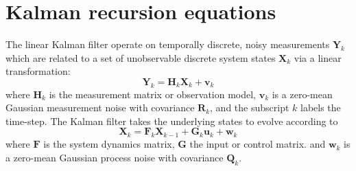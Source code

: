 \documentclass[fleqn,usenatbib,useAMS]{mnras}
\begin{document}
\section{Kalman recursion equations} \label{sec:kalman}
The linear Kalman filter operate on temporally discrete, noisy measurements $\boldsymbol{Y}_k$ which are related to a set of unobservable discrete system states $\boldsymbol{X}_k$ via a linear transformation:
\begin{equation}
	\boldsymbol{Y}_k = \boldsymbol{H}_k \boldsymbol{X}_k + \boldsymbol{v}_k \label{eq:kalman1}
\end{equation}
where $\boldsymbol{H}_k$ is the measurement matrix or observation model, $\boldsymbol{v}_k$ is a zero-mean Gaussian measurement noise with covariance $\boldsymbol{R}_k$, and the subscript $k$ labels the time-step. The Kalman filter takes the underlying states to evolve according to
\begin{equation}
	\boldsymbol{X}_k = \boldsymbol{F}_k \boldsymbol{X}_{k-1} + \boldsymbol{G}_k \boldsymbol{u}_k + \boldsymbol{w}_k \label{eq:kalman2}
\end{equation}
where $\boldsymbol{F}$ is the system dynamics matrix, $\boldsymbol{G}$ the input or control matrix. and $\boldsymbol{w}_k$ is a zero-mean Gaussian process noise with covariance $\boldsymbol{Q}_k$. \newline 
\end{document}
